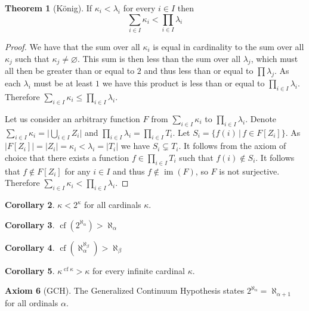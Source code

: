 \documentclass{article}
\theoremstyle{definition}
\newtheorem{thm}{Theorem}[section]
\newtheorem{crly}[thm]{Corollary}
\newtheorem{axm}[thm]{Axiom}
\newcommand*{\mtset}{\ensuremath{\varnothing}}
\DeclareMathOperator{\im}{im}
\DeclareMathOperator{\cf}{cf}
\newcommand{\abs}[1]{\lvert#1\rvert}
\begin{document}
\newpage

\begin{thm}[K\"{o}nig]
    If $\kappa_i < \lambda_i$ for every $i \in I$ then 
    \[
        \sum_{i \in I} \kappa_i < \prod_{i \in I} \lambda_i
    \]
\end{thm}

\begin{proof}
    We have that the sum over all $\kappa_i$ is equal in cardinality to the sum over all $\kappa_j$ such that $\kappa_j \ne \mtset$. This sum is then less than the sum over all $\lambda_j$, which must all then be greater than or equal to $2$ and thus less than or equal to $\prod \lambda_j$. As each $\lambda_i$ must be at least $1$ we have this product is less than or equal to $\prod_{i \in I} \lambda_i$. Therefore $\sum_{i \in I} \kappa_i \le \prod_{i \in I} \lambda_i$.
    
    Let us consider an arbitrary function $F$ from $\sum_{i \in I} \kappa_i$ to $\prod_{i \in I} \lambda_i$. Denote $\sum_{i \in I} \kappa_i = \abs{\bigcup_{i \in I} Z_i}$ and $\prod_{i \in I} \lambda_i = \prod_{i \in I} T_i$. Let $S_i = \{f(i) \, | \, f \in F[Z_i]\}$. As $\abs{F[Z_i]} = \abs{Z_i} = \kappa_i < \lambda_i = \abs{T_i}$ we have $S_i \subsetneq T_i$. It follows from the axiom of choice that there exists a function $f \in \prod_{i \in I} T_i$ such that $f(i) \not\in S_i$. It follows that $f \not\in F[Z_i]$ for any $i \in I$ and thus $f \not\in \im(F)$, so $F$ is not surjective. Therefore $\sum_{i \in I} \kappa_i < \prod_{i \in I} \lambda_i$.
\end{proof}

\begin{crly}
    $\kappa < 2^\kappa$ for all cardinals $\kappa$.
\end{crly}

\begin{crly}
    $\cf(2^{\aleph_\alpha}) > \aleph_\alpha$
\end{crly}

\begin{crly}
    $\cf(\aleph_{\alpha}^{\aleph_\beta}) > \aleph_\beta$
\end{crly}

\begin{crly}
    $\kappa^{\cf \kappa} > \kappa$ for every infinite cardinal $\kappa$.
\end{crly}

\begin{axm}[GCH]
    The Generalized Continuum Hypothesis  states $2^{\aleph_\alpha} = \aleph_{\alpha + 1}$ for all ordinals $\alpha$.
\end{axm}
\end{document}

